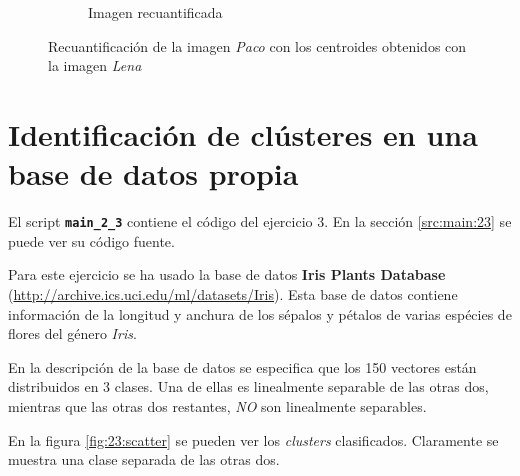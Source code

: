 \documentclass[11pt]{article} %
\begin{document}
\begin{figure}[h]
\begin{subfigure}[b]{0.48\textwidth}
        \caption[]{Imagen recuantificada}
        \label{fig:22:paco:requant}
    \end{subfigure}
    \caption{Recuantificación de la imagen \emph{Paco} con los centroides
             obtenidos con la imagen \emph{Lena}}
    \label{fig:22:paco}
\end{figure}

\clearpage
\restoregeometry

\section{Identificación de clústeres en una base de datos propia}

El script \textbf{\texttt{main\_2\_3}} contiene el código del ejercicio 3. En
la sección \ref{src:main:23} se puede ver su código fuente.

Para este ejercicio se ha usado la base de datos \textbf{Iris Plants Database}
(\url{http://archive.ics.uci.edu/ml/datasets/Iris}). Esta base de
datos contiene información de la longitud y anchura de los sépalos y pétalos de
varias espécies de flores del género \emph{Iris}.

En la descripción de la base de datos se especifica que los 150 vectores están
distribuidos en 3 clases. Una de ellas es linealmente separable de las otras
dos, mientras que las otras dos restantes, \emph{NO} son linealmente separables.

En la figura \ref{fig:23:scatter} se pueden ver los \emph{clusters}
clasificados. Claramente se muestra una clase separada de las otras dos.
\end{document}
